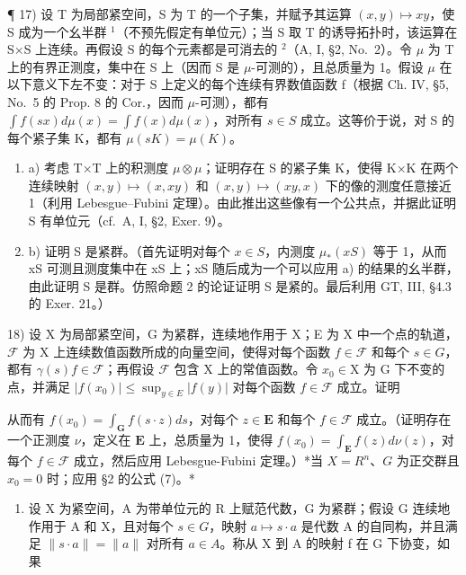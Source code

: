 ¶ 17) 设 T 为局部紧空间，S 为 T 的一个子集，并赋予其运算 \((x,y)\mapsto xy\)，使 S 成为一个幺半群 \(^{1}\)（不预先假定有单位元）；当 S 取 T 的诱导拓扑时，该运算在 S×S 上连续。再假设 S 的每个元素都是可消去的 \(^{2}\)（A, I, §2, No.~2）。令 \(\mu\) 为 T 上的有界正测度，集中在 S 上（因而 S 是 \(\mu\)-可测的），且总质量为 1。假设 \(\mu\) 在以下意义下左不变：对于 S 上定义的每个连续有界数值函数 f（根据 Ch. IV, §5, No.~5 的 Prop. 8 的 Cor.，因而 \(\mu\)-可测），都有 \(\int f(sx) d\mu(x) = \int f(x)d\mu(x)\)，对所有 \(s \in S\) 成立。这等价于说，对 S 的每个紧子集 K，都有 \(\mu(sK) = \mu(K)\)。

\begin{enumerate}
\def\labelenumi{\alph{enumi})}
\item
  a) 考虑 T×T 上的积测度 \(\mu\otimes\mu\)；证明存在 S 的紧子集 K，使得 K×K 在两个连续映射 \((x,y)\mapsto(x,xy)\) 和 \((x,y)\mapsto(xy,x)\) 下的像的测度任意接近 1（利用 Lebesgue--Fubini 定理）。由此推出这些像有一个公共点，并据此证明 S 有单位元（cf.~A, I, §2, Exer. 9）。
\item
  b) 证明 S 是紧群。（首先证明对每个 \(x \in S\)，内测度 \(\mu_{*}(xS)\) 等于 1，从而 xS 可测且测度集中在 xS 上；xS 随后成为一个可以应用 a) 的结果的幺半群，由此证明 S 是群。仿照命题 2 的论证证明 S 是紧的。最后利用 GT, III, §4.3 的 Exer. 21。）
\end{enumerate}

18) 设 X 为局部紧空间，G 为紧群，连续地作用于 X；E 为 X 中一个点的轨道，\(\mathcal {F}\) 为 X 上连续数值函数所成的向量空间，使得对每个函数 \(f \in \mathcal {F}\) 和每个 \(s \in G\)，都有 \(\gamma (s) f \in \mathcal {F}\)；再假设 \(\mathcal {F}\) 包含 X 上的常值函数。令 \(x _ {0} \in \mathrm{X}\) 为 G 下不变的点，并满足 \(| f (x _ {0}) | \leqslant \sup _ {y \in E} | f (y) |\) 对每个函数 \(f \in \mathcal {F}\) 成立。证明

从而有 \(f(x_0) = \int_{\mathbf{G}} f(s \cdot z) ds\)，对每个 \(z \in \mathbf{E}\) 和每个 \(f \in \mathcal{F}\) 成立。（证明存在一个正测度 \(\nu\)，定义在 \(\mathbf{E}\) 上，总质量为 1，使得 \(f(x_0) = \int_{\mathbf{E}} f(z) d\nu(z)\)，对每个 \(f \in \mathcal{F}\) 成立，然后应用 Lebesgue-Fubini 定理。）*当 \(X = R^n\)、\(G\) 为正交群且 \(x_0 = 0\) 时；应用 §2 的公式 (7)。*

\begin{enumerate}
\def\labelenumi{\arabic{enumi})}
\setcounter{enumi}{18}
\tightlist
\item
  设 X 为紧空间，A 为带单位元的 R 上赋范代数，G 为紧群；假设 G 连续地作用于 A 和 X，且对每个 \(s \in G\)，映射 \(a \mapsto s \cdot a\) 是代数 A 的自同构，并且满足 \(\|s \cdot a\| = \|a\|\) 对所有 \(a \in A\)。称从 X 到 A 的映射 f 在 G 下协变，如果
\end{enumerate}

